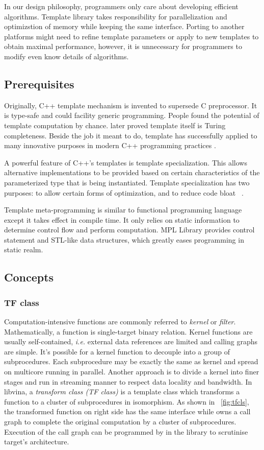 \documentclass[10pt, conference, compsocconf]{IEEEtran}
\begin{document}
In our design philosophy, programmers only care about developing efficient algorithms. Template library takes responsibility for parallelization and optimizstion of memory while keeping the same interface. Porting to another platforms might need to refine template parameters or apply to new templates to obtain maximal performance, however, it is unnecessary for programmers to modify even know details of algorithms.

\subsection{Prerequisites}
Originally, C++ template mechanism is invented to supersede C preprocessor. It is type-safe and could facility generic programming. People found the potential of template computation by chance. \cite{b6} later proved template itself is Turing completeness. Beside the job it meant to do, template has successfully applied to many innovative purposes in modern C++ programming practices \cite{b9}. 

A powerful feature of C++'s templates is template specialization. This allows alternative implementations to be provided based on certain characteristics of the parameterized type that is being instantiated. Template specialization has two purposes: to allow certain forms of optimization, and to reduce code bloat ~\cite{b18}.

Template meta-programming is similar to functional programming language except it takes effect in compile time. It only relies on static information to determine control flow and perform computation. MPL Library \cite{b16} provides control statement and STL-like data structures, which greatly eases programming in static realm.

\subsection{Concepts}
\subsubsection{TF class}
Computation-intensive functions are commonly referred to \emph{kernel} or \emph{filter}. Mathematically, a function is single-target binary relation. Kernel functions are usually self-contained, \textit{i.e.} external data references are limited and calling graphs are simple. It's possible for a kernel function to decouple into a group of subprocedures. Each subprocedure may be exactly the same as kernel and spread on multicore running in parallel.  Another approach is to divide a kernel into finer stages and run in streaming manner to respect data locality and bandwidth. In libvina, a \emph{transform class (TF class)} is a template class which transforms a function to a cluster of subprocedures in isomorphism. As shown in ~\ref{fig:tfcls}, the transformed function on right side has the same interface while owns a call graph to complete the original computation by a cluster of subprocedures. Execution of the call graph can be programmed by in the library to scrutinise target's architecture.
\end{document}
